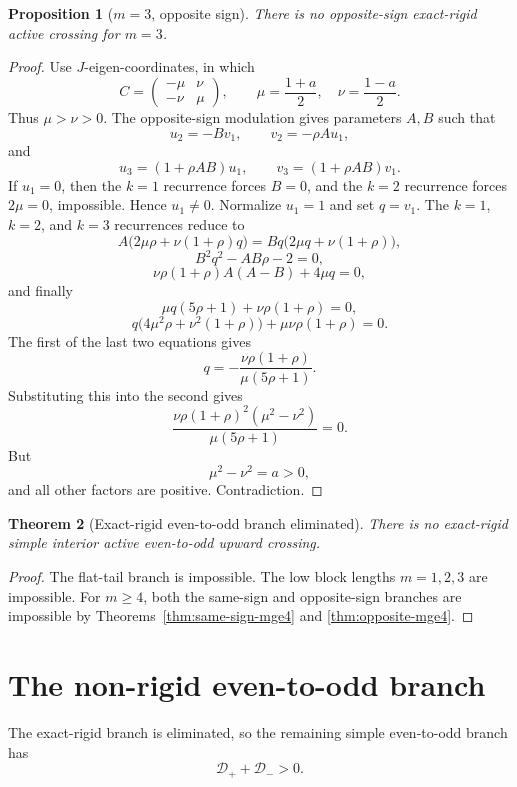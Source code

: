 \documentclass[11pt]{article}
\numberwithin{equation}{section}
\newtheorem{theorem}{Theorem}[section]
\newtheorem{proposition}[theorem]{Proposition}
\begin{document}
\begin{proposition}[\(m=3\), opposite sign]
There is no opposite-sign exact-rigid active crossing for \(m=3\).
\end{proposition}

\begin{proof}
Use \(J\)-eigen-coordinates, in which
\[
C=
\begin{pmatrix}
-\mu&\nu\\
-\nu&\mu
\end{pmatrix},
\qquad
\mu=\frac{1+a}{2},\quad
\nu=\frac{1-a}{2}.
\]
Thus \(\mu>\nu>0\). The opposite-sign modulation gives parameters \(A,B\) such that
\[
u_2=-Bv_1,\qquad
v_2=-\rho A u_1,
\]
and
\[
u_3=(1+\rho AB)u_1,\qquad
v_3=(1+\rho AB)v_1.
\]
If \(u_1=0\), then the \(k=1\) recurrence forces \(B=0\), and the \(k=2\) recurrence
forces \(2\mu=0\), impossible. Hence \(u_1\ne0\). Normalize \(u_1=1\) and set
\(q=v_1\). The \(k=1\), \(k=2\), and \(k=3\) recurrences reduce to
\[
A\bigl(2\mu\rho+\nu(1+\rho)q\bigr)
=
Bq\bigl(2\mu q+\nu(1+\rho)\bigr),
\]
\[
B^2q^2-AB\rho-2=0,
\]
\[
\nu\rho(1+\rho)A(A-B)+4\mu q=0,
\]
and finally
\[
\mu q(5\rho+1)+\nu\rho(1+\rho)=0,
\]
\[
q\bigl(4\mu^2\rho+\nu^2(1+\rho)\bigr)+\mu\nu\rho(1+\rho)=0.
\]
The first of the last two equations gives
\[
q=-\frac{\nu\rho(1+\rho)}{\mu(5\rho+1)}.
\]
Substituting this into the second gives
\[
\frac{\nu\rho(1+\rho)^2(\mu^2-\nu^2)}
{\mu(5\rho+1)}=0.
\]
But
\[
\mu^2-\nu^2=a>0,
\]
and all other factors are positive. Contradiction.
\end{proof}

\begin{theorem}[Exact-rigid even-to-odd branch eliminated]
\label{thm:rigid-eliminated}
There is no exact-rigid simple interior active even-to-odd upward crossing.
\end{theorem}

\begin{proof}
The flat-tail branch is impossible. The low block lengths \(m=1,2,3\) are impossible.
For \(m\ge4\), both the same-sign and opposite-sign branches are impossible by
Theorems~\ref{thm:same-sign-mge4} and \ref{thm:opposite-mge4}.
\end{proof}

\section{The non-rigid even-to-odd branch}

The exact-rigid branch is eliminated, so the remaining simple even-to-odd branch
has
\[
\mathcal D_++\mathcal D_->0.
\]
\end{document}
